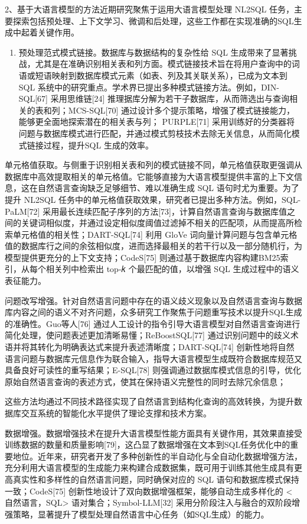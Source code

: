 \documentclass[12pt,a4paper,openright,UTF8]{ctexbook}
\begin{document}
2、基于大语言模型的方法近期研究聚焦于运用大语言模型处理 NL2SQL 任务，主要探索包括预处理、上下文学习、微调和后处理，这些工作都在实现准确的SQL生成中起着关键作用。

\begin{enumerate}[label=(\arabic*)]
\item 预处理范式模式链接。数据库与数据结构的复杂性给 SQL 生成带来了显著挑战，尤其是在准确识别相关表和列方面。模式链接技术旨在将用户查询中的词语或短语映射到数据库模式元素（如表、列及其关联关系），已成为文本到 SQL 系统中的研究重点。学术界已提出多种模式链接方法。例如，DIN-SQL[67] 采用思维链[24] 推理据库分解为若干子数据库，从而筛选出与查询相关的表和列；MCS-SQL[70] 通过设计多个提示策略，增强了模式链接能力，能够更全面地探索潜在的相关表与列； PURPLE[71] 采用训练好的分类器将问题与数据库模式进行匹配，并通过模式剪枝技术去除无关信息，从而简化模式链接过程，提升SQL 生成的效率。
\end{enumerate}


单元格值获取。与侧重于识别相关表和列的模式链接不同，单元格值获取更强调从数据库中高效提取相关的单元格值。它能够直接为大语言模型提供丰富的上下文信息，这在自然语言查询缺乏足够细节、难以准确生成 SQL 语句时尤为重要。为了提升 NL2SQL 任务中的单元格值获取效果，研究者已提出多种方法。例如，SQL-PaLM[72] 采用最长连续匹配子序列的方法[73]，计算自然语言查询与数据库值之间的关键词相似度，并通过设定相似度阈值过滤掉不相关的匹配项，从而提高所检索单元格值的相关性；DART-SQL[74] 利用 GloVe 词向量计算问题与包含单元格值的数据库行之间的余弦相似度，进而选择最相关的若干行以及一部分随机行，为模型提供更充分的上下文支持；CodeS[75] 则通过基于数据库内容构建BM25索引，从每个相关列中检索出 top-𝑘 个最匹配的值，以增强 SQL 生成过程中的语义表征能力。


问题改写增强。针对自然语言问题中存在的语义歧义现象以及自然语言查询与数据库内容之间的语义不对齐问题，众多研究工作聚焦于问题重写技术以提升SQL生成的准确性。Guo等人[76] 通过人工设计的指令引导大语言模型对自然语言查询进行简化处理，使问题表述更加清晰易懂；ReBoostSQL[77] 通过识别问题中的歧义术语并将其转化为明确表达式来提升表述清晰度；DART-SQL[74] 创新性地将自然语言问题与数据库元信息作为联合输入，指导大语言模型生成既符合数据库规范又具备良好可读性的重写结果；E-SQL[78] 则强调通过数据库模式信息的引导，优化原始自然语言查询的表述方式，使其在保持语义完整性的同时去除冗余信息；


这些方法均通过不同技术路径实现了自然语言到结构化查询的高效转换，为提升数据库交互系统的智能化水平提供了理论支撑和技术方案。


数据增强。数据增强技术在提升大语言模型性能方面具有关键作用，其效果直接受训练数据的数量和质量影响[79]，这凸显了数据增强在文本到SQL任务优化中的重要地位。近年来，研究者开发了多种创新性的半自动化与全自动化数据增强方法，充分利用大语言模型的生成能力来构建合成数据集，既可用于训练其他生成具有更高真实性和多样性的自然语言问题，同时确保对应的 SQL 语句和数据库模式保持一致；CodeS[75] 创新性地设计了双向数据增强框架，能够自动生成多样化的 < 自然语言，SQL> 语对集合；Symbol-LLM[32] 采用分阶段注入与融合的双阶段增强策略，显著提升了模型处理自然语言中心任务（如SQL生成）的能力。
\end{document}
